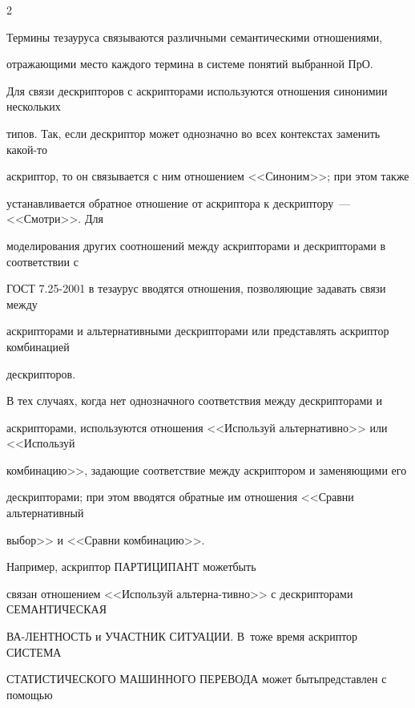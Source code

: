 \begin{multicols}{2}
\begin{itemize}
\end{itemize}

  

  Термины тезауруса связываются различными семантическими отношениями, 

отражающими место каждого термина в системе понятий выбранной ПрО.

  

  Для связи дескрипторов с аскрипторами используются отношения синонимии нескольких 

типов. Так, если дескриптор может однозначно во всех контекстах заменить какой-то 

аскриптор, то он связывается с ним отношением <<Синоним>>; при этом также 

устанавливается обратное отношение от аскриптора к дескриптору~--- <<Смотри>>. Для 

моделирования других соотношений между аскрипторами и дескрипторами в соответствии с 

ГОСТ 7.25-2001 в тезаурус вводятся отношения, позволяющие задавать связи между 

аскрипторами и альтернативными дескрипторами или представлять аскриптор комбинацией 

дескрипторов. 

  

  В тех случаях, когда нет однозначного соответствия между дескрипторами и 

аскрипторами, используются отношения <<Используй альтернативно>> или <<Используй 

комбинацию>>, задающие соответствие между аскриптором и заменяющими его 

дескрипторами; при этом вводятся обратные им отношения <<Сравни альтернативный 

выбор>> и <<Сравни комбинацию>>. 



Например, аскриптор ПАРТИЦИПАНТ может\linebreak быть 

связан отношением <<Используй альтерна-\linebreak тивно>> с дескрипторами СЕМАНТИЧЕСКАЯ 

ВА-\linebreak ЛЕНТНОСТЬ и УЧАСТНИК СИТУАЦИИ. В~то\linebreak же время аскриптор СИСТЕМА 

СТАТИСТИЧЕСКОГО МАШИННОГО ПЕРЕВОДА может быть\linebreak представлен с помощью 


\end{multicols}
